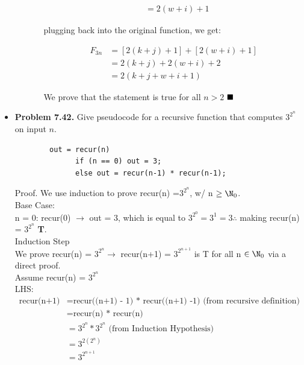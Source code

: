 \documentclass{article}
\begin{document}
\begin{itemize}
\begin{enumerate}[label=(d)]
\begin{enumerate}[label=(\roman*)]
\begin{align*}
                             &= 2(w + i) + 1
                \end{align*}
                \begin{center}
                    plugging back into the original function, we get:
                \end{center}
                \begin{align*}
                    F_{3n} &= [2(k+j) + 1] + [2(w+i) + 1]\\
                           &= 2(k + j) + 2(w+i) + 2\\
                           &= 2(k + j + w + i + 1)
                \end{align*}
                \begin{center}
                    We prove that the statement is true for all $n > 2$ $\hfill\blacksquare$
                \end{center}
            \end{enumerate}
        \end{enumerate}
        \item \textbf{Problem 7.42.} Give pseudocode for a recursive function that computes $3^{2^n}$ on input $n$.
        \begin{verbatim}
		out = recur(n)
		      if (n == 0) out = 3;
		      else out = recur(n-1) * recur(n-1);
	\end{verbatim}
	Proof. We use induction to prove recur(n) =$ 3^{2^n}$, w/ n $\ge \N_0$.\\
	Base Case:\\
	n = 0: recur(0) $\rightarrow$ out = 3, which is equal to $3^{2^0} = 3^1 = 3 \therefore$ making recur(n) = $3^{2^n}$ \textbf{T}.\\
	Induction Step\\
	We prove recur(n) = $ 3^{2^n} \rightarrow$ recur(n+1) = $ 3^{2^{n+1}}$ is T for all n $\in \N_0$ via a direct proof.\\
	Assume recur(n) = $ 3^{2^n}$\\
	LHS:\\
	\begin{align*}
	\text{recur(n+1)} &= \text{recur((n+1) - 1) * recur((n+1) -1) (from recursive definition)}\\ 
	&= \text{recur(n) * recur(n)}\\
	&= 3^{2^n} * 3^{2^n} \text{ (from Induction Hypothesis)}\\ 
	&= 3^{2(2^n)}\\
	&= 3^{2^{n+1}}\\
	\end{align*}

\end{itemize}
\end{document}

